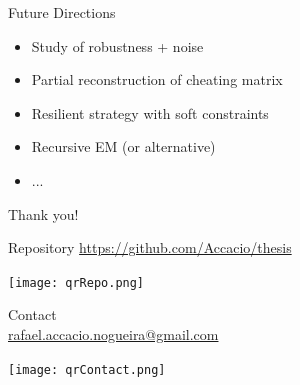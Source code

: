 \documentclass[aspectratio=169]{beamer}
\begin{document}
\begin{frame}{Future Directions}
      \pause
    \begin{itemize}
      \item Study of robustness + noise \pause
      \item Partial reconstruction of cheating matrix \pause
      \item Resilient strategy with soft constraints \pause
      \item Recursive EM (or alternative)\pause
      \item ...
    \end{itemize}
\end{frame}

\appendix

\begin{frame}[plain]
  \centering
  \vfill
  Thank you!
  \vfill
  \begin{minipage}[t]{.45\linewidth}
    \small
    \centering
    Repository
    \href{https://github.com/Accacio/thesis}{https://github.com/Accacio/thesis}

    \texttt{[image: qrRepo.png]}
  \end{minipage}
  \hfill
  \begin{minipage}[t]{.5\linewidth}
    \small
    \centering
    Contact\\
    \href{mailto:rafael.accacio.nogueira@gmail.com?subject=Thesis Defense Presentation}{rafael.accacio.nogueira@gmail.com}

    \texttt{[image: qrContact.png]}
  \end{minipage}
  \fi

\end{frame}





\end{document}
